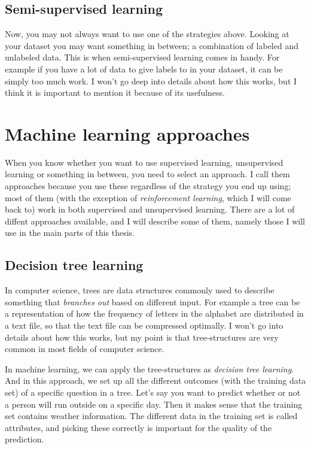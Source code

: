 \subsection{Semi-supervised learning}
Now, you may not always want to use one of the strategies above. Looking at your dataset you may want something in between; 
a combination of labeled and unlabeled data. This is when semi-supervised learning comes in handy. For example if you have 
a lot of data to give labels to in your dataset, it can be simply too much work. I won't go deep into details about how this works, 
but I think it is important to mention it because of its usefulness.


\section{Machine learning approaches}
When you know whether you want to use supervised learning, unsupervised learning or something in between, you need to select an approach.
I call them approaches because you use these regardless of the strategy you end up using; most of them (with the exception of \textit{reinforcement learning}, 
which I will come back to) work in both supervised and unsupervised learning. There are a lot of diffent approaches available, and I will describe some of them,
namely those I will use in the main parts of this thesis.

\subsection{Decision tree learning}
In computer science, trees are data structures commonly used to describe something that \textit{branches out} based on different input. 
For example a tree can be a representation of how the frequency of letters in the alphabet are distributed in a text file, so that the text file 
can be compressed optimally. I won't go into details about how this works, but my point is that tree-structures are very common in most fields of 
computer science. 

In machine learning, we can apply the tree-structures as \textit{decision tree learning}. And in this approach, we set up all the different outcomes
(with the training data set) of a specific question in a tree. Let's say you want to predict whether or not a person will run outside on a specific day.
Then it makes sense that the training set contains weather information. The different data in the training set is called attributes, and picking these 
correctly is important for the quality of the prediction.

